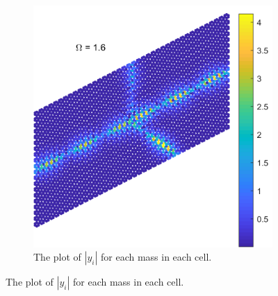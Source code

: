 \begin{figure}[!h]
\begin{subfigure}[b]{.5\textwidth}
  \includegraphics[width=1\linewidth]{imgs/esplitscat.png}
  \caption{The plot of $|y_i|$ for each mass in each cell.}
  \label{fig:sub2}
\end{subfigure}


\end{figure}
